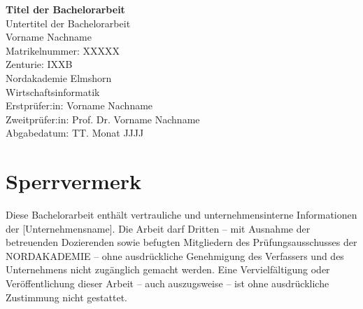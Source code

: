 
\begin{titlepage}
\centering
\vspace*{2cm}

{\Huge \textbf{Titel der Bachelorarbeit}}\\[1.5cm]
{\Large Untertitel der Bachelorarbeit}\\[2cm]

{\Large Vorname Nachname}\\[0.5cm]
{\large Matrikelnummer: XXXXX}\\[1.5cm]
{\large Zenturie: IXXB}\\[1.5cm]

{\large Nordakademie Elmshorn}\\
{\large Wirtschaftsinformatik}\\[2cm]

{\large Erstpr\"{u}fer:in: Vorname Nachname}\\[0.5cm]
{\large Zweitpr\"{u}fer:in: Prof. Dr. Vorname Nachname}\\[2cm]

{\large Abgabedatum: TT. Monat JJJJ}\\

\vfill
\end{titlepage}

\section*{Sperrvermerk}
Diese Bachelorarbeit enth\"{a}lt vertrauliche und unternehmensinterne Informationen der
[Unternehmensname].
Die Arbeit darf Dritten -- mit Ausnahme der betreuenden Dozierenden sowie befugten
Mitgliedern des Pr\"{u}fungsausschusses der NORDAKADEMIE -- ohne ausdr\"{u}ckliche
Genehmigung des Verfassers und des Unternehmens nicht zug\"{a}nglich gemacht werden.
Eine Vervielf\"{a}ltigung oder Ver\"{o}ffentlichung dieser Arbeit -- auch auszugsweise --
ist ohne ausdr\"{u}ckliche Zustimmung nicht gestattet.

\newpage

